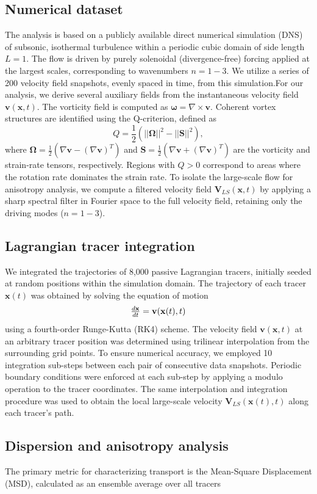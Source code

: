 \documentclass[]{article}
\begin{document}
\subsection{Numerical dataset}The analysis is based on a publicly available direct numerical simulation (DNS) of subsonic, isothermal turbulence within a periodic cubic domain of side length $L=1$. The flow is driven by purely solenoidal (divergence-free) forcing applied at the largest scales, corresponding to wavenumbers $n=1-3$. We utilize a series of 200 velocity field snapshots, evenly spaced in time, from this simulation.For our analysis, we derive several auxiliary fields from the instantaneous velocity field $\mathbf{v}(\mathbf{x}, t)$. The vorticity field is computed as $\boldsymbol{\omega} = \nabla \times \mathbf{v}$. Coherent vortex structures are identified using the Q-criterion, defined as\begin{equation}Q = \frac{1}{2} \left( ||\boldsymbol{\Omega}||^2 - ||\mathbf{S}||^2 \right),\end{equation}where $\boldsymbol{\Omega} = \frac{1}{2}(\nabla\mathbf{v} - (\nabla\mathbf{v})^T)$ and $\mathbf{S} = \frac{1}{2}(\nabla\mathbf{v} + (\nabla\mathbf{v})^T)$ are the vorticity and strain-rate tensors, respectively. Regions with $Q > 0$ correspond to areas where the rotation rate dominates the strain rate. To isolate the large-scale flow for anisotropy analysis, we compute a filtered velocity field $\mathbf{V}_{LS}(\mathbf{x}, t)$ by applying a sharp spectral filter in Fourier space to the full velocity field, retaining only the driving modes ($n=1-3$).\subsection{Lagrangian tracer integration}We integrated the trajectories of 8,000 passive Lagrangian tracers, initially seeded at random positions within the simulation domain. The trajectory of each tracer $\mathbf{x}(t)$ was obtained by solving the equation of motion\begin{equation}$$\frac{d\mathbf{x}}{dt} = \mathbf{v}(\mathbf{x}(t), t)$$\end{equation}using a fourth-order Runge-Kutta (RK4) scheme. The velocity field $\mathbf{v}(\mathbf{x}, t)$ at an arbitrary tracer position was determined using trilinear interpolation from the surrounding grid points. To ensure numerical accuracy, we employed 10 integration sub-steps between each pair of consecutive data snapshots. Periodic boundary conditions were enforced at each sub-step by applying a modulo operation to the tracer coordinates. The same interpolation and integration procedure was used to obtain the local large-scale velocity $\mathbf{V}_{LS}(\mathbf{x}(t), t)$ along each tracer's path.\subsection{Dispersion and anisotropy analysis}The primary metric for characterizing transport is the Mean-Square Displacement (MSD), calculated as an ensemble average over all tracers  
\end{document}
